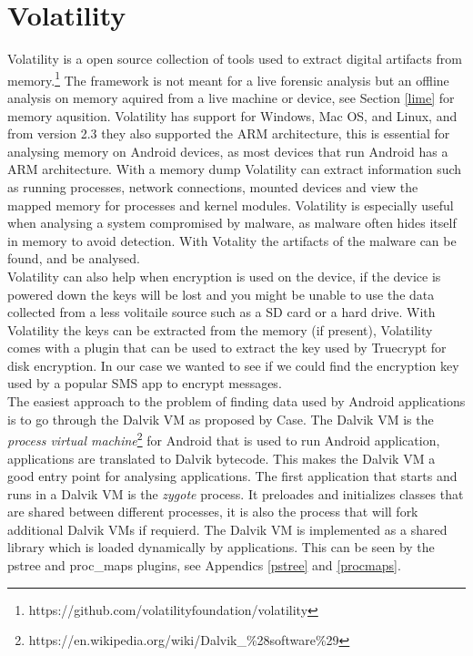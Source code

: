\section{Volatility}
Volatility is a open source collection of tools used to extract digital
artifacts from memory.\footnote{https://github.com/volatilityfoundation/volatility} 
The framework is not meant for a live forensic analysis but an offline analysis
on memory aquired from a live machine or device, see Section \ref{lime} for
memory aqusition. Volatility has support for Windows, Mac OS, and Linux, and
from version 2.3 they also supported the ARM architecture, this is essential
for analysing memory on Android devices, as most devices that run Android has a
ARM architecture. With a memory dump Volatility can extract information such as
running processes, network connections, mounted devices and view the mapped
memory for processes and kernel modules. Volatility is especially useful when
analysing a system compromised by malware, as malware often hides itself in
memory to avoid detection. With Votality the artifacts of the malware can be
found, and be analysed. \\

Volatility can also help when encryption is used on the device, if the device is
powered down the keys will be lost and you might be unable to use the data 
collected from a less volitaile source such as a SD card or a hard drive. With
Volatility the keys can be extracted from the memory (if present), Volatility 
comes with a plugin that can be used to extract the key used by Truecrypt for 
disk encryption. In our case we wanted to see if we could find the encryption
key used by a popular SMS app to encrypt messages.\\

The easiest approach to the problem of finding data used by Android
applications is to go through the Dalvik VM as proposed by Case\cite{case2011}.
The Dalvik VM is the \textit{process virtual
machine}\footnote{https://en.wikipedia.org/wiki/Dalvik\_\%28software\%29} for
Android that is used to run Android application, applications are translated to
Dalvik bytecode. This makes the Dalvik VM a good entry point for analysing
applications. The first application that starts and runs in a Dalvik VM is the
\textit{zygote} process. It preloades and initializes classes that are shared
between different processes, it is also the process that will fork additional
Dalvik VMs if requierd. The Dalvik VM is implemented as a shared library which
is loaded dynamically by applications. This can be seen by the pstree and
proc\_maps plugins, see Appendics \ref{pstree} and \ref{procmaps}. \\

